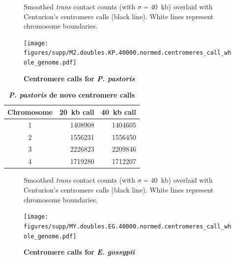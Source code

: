 \clearpage



\begin{figure}[ht!]
\caption{\textbf{Centromere calls for \textit{P. pastoris}}}{
Smoothed \textit{trans} contact counts (with $\sigma=40$~kb) overlaid with
Centurion's centromere calls (black line). White lines represent chromosome
boundaries.
}
\begin{center}
\texttt{[image: figures/supp/M2.doubles.KP.40000.normed.centromeres\_call\_whole\_genome.pdf]}
\end{center}
\label{suppfig:KP_calls}
\end{figure}



\begin{table}[ht!]
\caption{\textbf{\textit{P. pastoris} de novo centromere calls}}
\begin{center}
\begin{tabular}{c | r r}
\textbf{Chromosome} & \textbf{20~kb call} & \textbf{40~kb call} \\
\hline
1 & \num[group-separator={\,}]{1408908} & \num[group-separator={\,}]{1404605} \\
2 & \num[group-separator={\,}]{1556231} & \num[group-separator={\,}]{1556450} \\
3 & \num[group-separator={\,}]{2226823} & \num[group-separator={\,}]{2209846} \\
4 & \num[group-separator={\,}]{1719280} & \num[group-separator={\,}]{1712207} \\
\end{tabular}
\end{center}
\end{table}



\clearpage


\begin{figure}[ht!]
\caption{\textbf{Centromere calls for \textit{E. gossypii}}}{
Smoothed \textit{trans} contact counts (with $\sigma=40$~kb) overlaid with
Centurion's centromere calls (black line). White lines represent chromosome
boundaries.
}

\begin{center}
\texttt{[image: figures/supp/MY.doubles.EG.40000.normed.centromeres\_call\_whole\_genome.pdf]}
\end{center}
\label{suppfig:EG_calls}
\end{figure}


